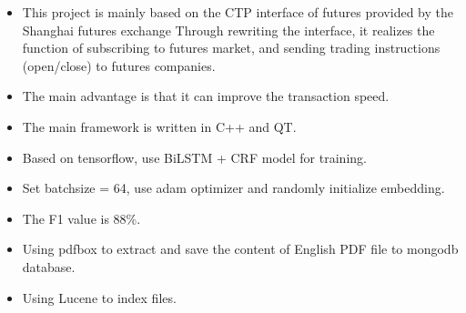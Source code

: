 \begin{itemize}
\setlength{\baselineskip}{16pt}
\justifying
\item This project is mainly based on the CTP interface of futures provided by the Shanghai futures exchange
Through rewriting the interface, it realizes the function of subscribing to futures market,
and sending trading instructions (open/close) to futures companies.
\item The main advantage is that it can improve the transaction speed.
\item The main framework is written in C++ and QT.
\end{itemize}
\smallskip

\divider

\begin{itemize}
\setlength{\baselineskip}{16pt}
\justifying
\item Based on tensorflow, use BiLSTM + CRF model for training.
\item Set batchsize = 64, use adam optimizer and randomly initialize embedding.
\item The F1 value is 88\%.
\end{itemize}
\smallskip

\divider

\begin{itemize}
\setlength{\baselineskip}{16pt}
\justifying
\item Using pdfbox to extract and save the content of English PDF file to mongodb database.
\item Using Lucene to index files.
\end{itemize}
\smallskip


\par
\smallskip


\par
\smallskip

